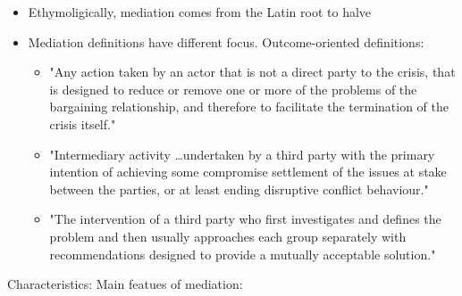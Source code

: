 \begin{itemize}
    \item Ethymoligically, mediation comes from the Latin root to halve
    \item Mediation definitions have different focus. Outcome-oriented definitions:
        \begin{itemize}
            \item "Any action taken by an actor that is not a direct party to
                the crisis, that is designed to reduce or remove one or more
                of the problems of the bargaining relationship, and therefore
                to facilitate the termination of the crisis itself."
            \item "Intermediary activity \dots undertaken by a third party with
                the primary intention of achieving some compromise settlement
                of the issues at stake between the parties, or at least ending
                disruptive conflict behaviour."
            \item "The intervention of a third party who first investigates
                and defines the problem and then usually approaches each
                group separately with recommendations designed to provide
                a mutually acceptable solution."
        \end{itemize}
\end{itemize}

Characteristics: Main featues of mediation:


